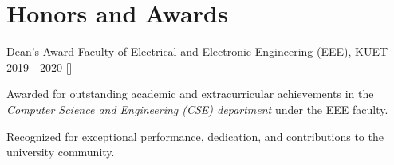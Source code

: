 \section{\textbf{Honors and Awards}}
\vspace{-0.4mm}
\resumeSubHeadingListStart

\resumeProject
  {Dean's Award}
  {Faculty of Electrical and Electronic Engineering (EEE), KUET}
  {2019 - 2020}
  {{}[\href{https://old.kuet.ac.bd/index.php/welcome/deanslist}{\textcolor{darkblue}{\faGlobe}}]} %

\resumeItemListStart
  \item Awarded for outstanding academic and extracurricular achievements in the \textit{Computer Science and Engineering (CSE) department} under the EEE faculty.
  \item Recognized for exceptional performance, dedication, and contributions to the university community.
\resumeItemListEnd

\resumeSubHeadingListEnd 

\vspace{-6mm}
